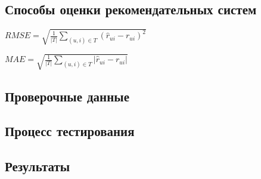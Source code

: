 \documentclass[12pt]{article} %
\begin{document}
\subsection{Способы оценки рекомендательных систем}

$RMSE=\sqrt{\frac{1}{|T|}\sum_{(u,i)\in T} (\hat{r}_{ui} - r_{ui})^2}$

$MAE=\sqrt{\frac{1}{|T|}\sum_{(u,i)\in T} |\hat{r}_{ui} - r_{ui}|}$

\subsection{Проверочные данные}


\subsection{Процесс тестирования}

\subsection{Результаты}
\end{document}
